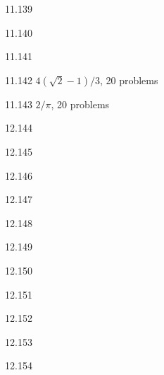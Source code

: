 \begin{solution}{{11.139}}
\end{solution}
\protect \hypertarget {soln:11.140}{}
\begin{solution}{{11.140}}
\end{solution}
\protect \hypertarget {soln:11.141}{}
\begin{solution}{{11.141}}
\end{solution}
\protect \hypertarget {soln:11.142}{}
\begin{solution}{{11.142}}
  $4(\sqrt{2}-1)/3$, 20 problems
\end{solution}
\protect \hypertarget {soln:11.143}{}
\begin{solution}{{11.143}}
  $2/\pi$, 20 problems
\end{solution}
\protect \hypertarget {soln:12.144}{}
\begin{solution}{{12.144}}
\end{solution}
\protect \hypertarget {soln:12.145}{}
\begin{solution}{{12.145}}
\end{solution}
\protect \hypertarget {soln:12.146}{}
\begin{solution}{{12.146}}
\end{solution}
\protect \hypertarget {soln:12.147}{}
\begin{solution}{{12.147}}
\end{solution}
\protect \hypertarget {soln:12.148}{}
\begin{solution}{{12.148}}
\end{solution}
\protect \hypertarget {soln:12.149}{}
\begin{solution}{{12.149}}
\end{solution}
\protect \hypertarget {soln:12.150}{}
\begin{solution}{{12.150}}
\end{solution}
\protect \hypertarget {soln:12.151}{}
\begin{solution}{{12.151}}
\end{solution}
\protect \hypertarget {soln:12.152}{}
\begin{solution}{{12.152}}
\end{solution}
\protect \hypertarget {soln:12.153}{}
\begin{solution}{{12.153}}
\end{solution}
\protect \hypertarget {soln:12.154}{}
\begin{solution}{{12.154}}
\end{solution}
\protect \hypertarget {soln:12.155}{}
